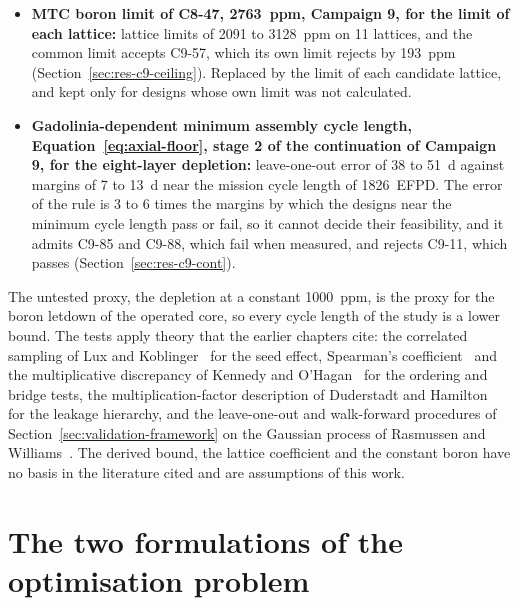 \begin{itemize}
        depletion, are 253 and \SI{185}{d} short of it with the
        eight-layer depletion (Section~\ref{sec:res-c9-axial}). Replaced, for every front
        member, by the eight-layer depletion of the three-dimensional
        core, and the front rescored on it and the search continued
        under it give C9-27, C9-69 and C9-70.
  \item \textbf{MTC boron limit of C8-47, \SI{2763}{ppm}, Campaign 9,
        for the limit of each lattice:} lattice limits of 2091 to
        \SI{3128}{ppm} on 11 lattices, and the common limit accepts
        C9-57, which its own limit rejects by \SI{193}{ppm}
        (Section~\ref{sec:res-c9-ceiling}). Replaced by the limit of
        each candidate lattice, and kept only for designs whose own
        limit was not calculated.
    \item \textbf{Gadolinia-dependent minimum assembly cycle length,
        Equation~\eqref{eq:axial-floor}, stage 2 of the continuation of
        Campaign 9, for the eight-layer depletion:} leave-one-out error
        of 38 to \SI{51}{d} against margins of 7 to \SI{13}{d} near the
        mission cycle length of \SI{1826}{EFPD}. The error of the rule is 3 to 6 times the margins by
        which the designs near the minimum cycle length pass or fail,
        so it cannot decide their feasibility, and it admits C9-85 and
        C9-88, which fail when measured, and rejects C9-11, which
        passes (Section~\ref{sec:res-c9-cont}).
\end{itemize}

The untested proxy, the depletion at a constant \SI{1000}{ppm}, is the proxy for the boron letdown of the operated core,
so every cycle length of the study is a lower bound. The tests apply
theory that the earlier chapters cite: the correlated sampling of Lux
and Koblinger~\cite{lux_koblinger_1991} for the seed effect, Spearman's
coefficient~\cite{kendall_gibbons_1990} and the multiplicative
discrepancy of Kennedy and O'Hagan~\cite{kennedy_ohagan_2000} for the
ordering and bridge tests, the multiplication-factor description of
Duderstadt and Hamilton~\cite{duderstadt_hamilton_1976} for the leakage
hierarchy, and the leave-one-out and walk-forward procedures of
Section~\ref{sec:validation-framework} on the Gaussian process of
Rasmussen and Williams~\cite{rasmussen_gp_2006}. The derived bound, the
lattice coefficient and the constant boron have no basis in the
literature cited and are assumptions of this work.

\section{The two formulations of the optimisation problem}
\label{sec:concl-reform}

